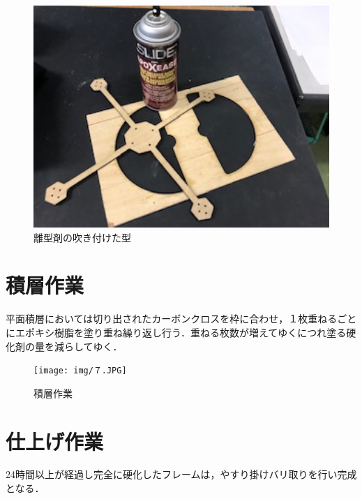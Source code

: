 \begin{figure}[htbp]
  \begin{center}
    \includegraphics[width=120mm]{img/１８.JPG}
    \end{center}
  \caption{離型剤の吹き付けた型}
 \label{fig:robot}
\end{figure}

\section{積層作業}
平面積層においては切り出されたカーボンクロスを枠に合わせ，１枚重ねるごとにエポキシ樹脂を塗り重ね繰り返し行う．重ねる枚数が増えてゆくにつれ塗る硬化剤の量を減らしてゆく．

\begin{figure}[htbp]
  \begin{center}
    \texttt{[image: img/７.JPG]}
    \end{center}
  \caption{積層作業}
 \label{fig:robot}
\end{figure}

\section{仕上げ作業}
24時間以上が経過し完全に硬化したフレームは，やすり掛けバリ取りを行い完成となる．

